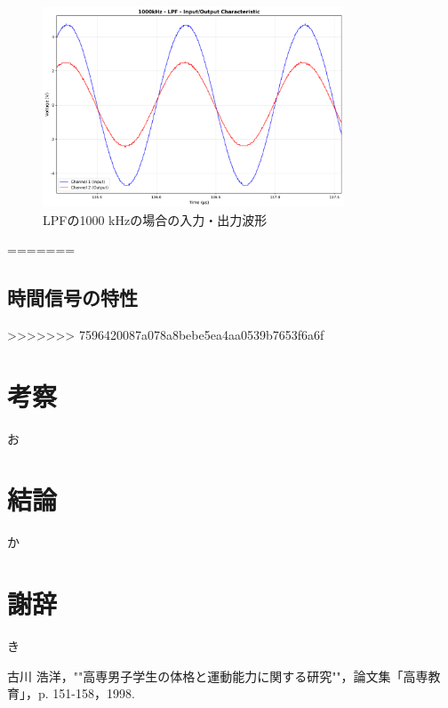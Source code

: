 \documentclass[11pt,dvipdfmx]{jarticle}
\begin{document}
\begin{figure}[H]
  \centering
  \includegraphics[width=0.8\textwidth]{graphs/1000kHz_LPF_characteristic.png}
  \caption{LPFの1000 kHzの場合の入力・出力波形}
  \label{fig:LPF_1000kHz}
\end{figure}







=======
\subsection{時間信号の特性}
>>>>>>> 7596420087a078a8bebe5ea4aa0539b7653f6a6f

\section{考察}
お

\section{結論}
か

\section{謝辞}
き


\begin{thebibliography}{99}
 古川 浩洋，""高専男子学生の体格と運動能力に関する研究""，論文集「高専教育」，p. 151-158，1998.
\end{thebibliography}
\end{document}

